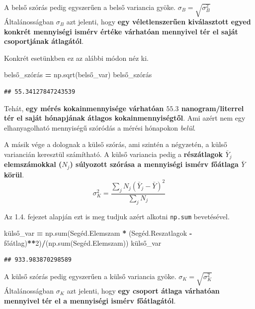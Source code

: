 \documentclass[
]{book}
\newenvironment{Shaded}{\begin{snugshade}}{\end{snugshade}}
\newcommand{\BuiltInTok}[1]{#1}
\newcommand{\DecValTok}[1]{\textcolor[rgb]{0.00,0.00,0.81}{#1}}
\newcommand{\NormalTok}[1]{#1}
\newcommand{\OperatorTok}[1]{\textcolor[rgb]{0.81,0.36,0.00}{\textbf{#1}}}
\begin{document}
A belső szórás pedig egyszerűen a belső variancia gyöke. \(\sigma_B=\sqrt{\sigma_B^2}\) Általánosságban \(\sigma_B\) azt jelenti, hogy \textbf{egy véletlenszerűen kiválasztott egyed konkrét mennyiségi ismérv értéke várhatóan mennyivel tér el saját csoportjának átlagától}.

Konkrét esetünkben ez az alábbi módon néz ki.

\begin{Shaded}
\begin{Highlighting}[]
\NormalTok{belső\_szórás }\OperatorTok{=}\NormalTok{ np.sqrt(belső\_var)}
\NormalTok{belső\_szórás}
\end{Highlighting}
\end{Shaded}

\begin{verbatim}
## 55.34127847243539
\end{verbatim}

Tehát, \textbf{egy mérés kokainmennyisége várhatóan \(55.3\) nanogram/literrel tér el saját hónapjának átlagos kokainmennyiségtől}. Ami azért nem egy elhanyagolható mennyiségű szóródás a mérési hónapokon \emph{belül}.

A másik vége a dolognak a külső szórás, ami szintén a négyzetén, a külső variancián keresztül számítható. A külső variancia pedig a \textbf{részátlagok \(\bar{Y}_j\) elemszámokkal (\(N_j\)) súlyozott szórása a mennyiségi ismérv főátlaga \(\bar{Y}\) körül}. \[\sigma_K^2=\frac{\sum_j{N_j(\bar{Y}_j-\bar{Y})^2}}{\sum_j{N_j}}\]

Az 1.4. fejezet alapján ezt is meg tudjuk azért alkotni \texttt{np.sum} bevetésével.

\begin{Shaded}
\begin{Highlighting}[]
\NormalTok{külső\_var }\OperatorTok{=}\NormalTok{ np.}\BuiltInTok{sum}\NormalTok{(Segéd.Elemszam }\OperatorTok{*}\NormalTok{ (Segéd.Reszatlagok }\OperatorTok{{-}}\NormalTok{ főátlag)}\OperatorTok{**}\DecValTok{2}\NormalTok{)}\OperatorTok{/}\NormalTok{(np.}\BuiltInTok{sum}\NormalTok{(Segéd.Elemszam))}
\NormalTok{külső\_var}
\end{Highlighting}
\end{Shaded}

\begin{verbatim}
## 933.983870298589
\end{verbatim}

A külső szórás pedig egyszerűen a külső variancia gyöke. \(\sigma_K=\sqrt{\sigma_K^2}\) Általánosságban \(\sigma_K\) azt jelenti, hogy \textbf{egy csoport átlaga várhatóan mennyivel tér el a mennyiségi ismérv főátlagától}.
\end{document}
